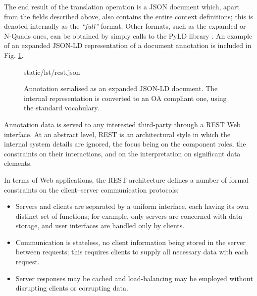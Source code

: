 The end result of the translation operation is a JSON document which, apart
from the fields described above, also contains the entire context definitions;
this is denoted internally as the \textit{``full''} format. Other formats, such
as the expanded or N-Quads ones, can be obtained by simply calls to the PyLD
library \cite{ref:pyld}. An example of an expanded JSON-LD representation of a
document annotation is included in Fig. \ref{lst:annojson}.

\begin{figure}[!ht]
  
    {static/lst/rest.json}
    \caption[Annotation serialised as an expanded JSON-LD document]
            {Annotation serialised as an expanded JSON-LD document. The internal
             representation is converted to an OA compliant one, using the
             standard vocabulary.}
    \label{lst:annojson}
\end{figure}

Annotation data is served to any interested third-party through a REST Web
interface. At an abstract level, REST is an architectural style in which the
internal system details are ignored, the focus being on the component roles,
the constraints on their interactions, and on the interpretation on significant
data elements.

In terms of Web applications, the REST architecture defines a number of formal
constraints on the client--server communication protocols:
\begin{itemize}
  \item Servers and clients are separated by a uniform interface, each having
        its own distinct set of functions; for example, only servers are
        concerned with data storage, and user interfaces are handled only by
        clients.
  \item Communication is stateless, no client information being stored in the
        server between requests; this requires clients to supply all necessary
        data with each request.
  \item Server responses may be cached and load-balancing may be employed
        without disrupting clients or corrupting data.
\end{itemize}

